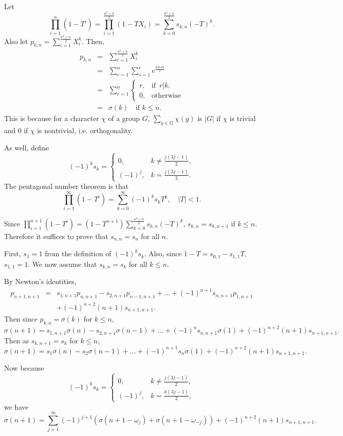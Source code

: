 \documentclass{amsart}
\begin{document}
Let
\[
\prod_{i=1}^n (1-T^i)=\prod_{i=1}^{\frac{n^2+n}{2}} (1-TX_i)=
\sum_{k=0}^{\frac{n^2+n}{2}} s_{k,n}(-T)^k.
\]
Also let $p_{k,n}=\sum_{i=1}^{\frac{n^2+n}{2}}X_i^k$.
Then,
\begin{eqnarray}
\nonumber
p_{k,n}&=&\sum_{i=1}^{\frac{n^2+n}{2}}X_i^k\\
\nonumber
&=&\sum_{r=1}^n \sum_{s=1}^r e^{\frac{2\pi isk}{r}}\\
\nonumber
&=&\sum_{r=1}^n \begin{cases}
r,&\textrm{if }\, r|k,\\
0,&\textrm{otherwise}
\label{pkn}
\end{cases}
\\
&=&\sigma(k) \quad \textrm{if $k\leq n$}.
\end{eqnarray}
This is because for a character $\chi$ of a group $G$, $\sum_{g \in G} \chi(g)$ is $|G|$ if $\chi$ is trivial and $0$ if $\chi$ is nontrivial, i.e. orthogonality.

As well, define
\[
(-1)^k s_k=\begin{cases}
0,&k \neq \frac{j(3j-1)}{2},\\
(-1)^j,& k=\frac{j(3j-1)}{2}.
\end{cases}
\]
The pentagonal number theorem is that
\[
\prod_{i=1}^\infty (1-T^i)=\sum_{k=0}^\infty (-1)^k s_k T^k, \quad |T|<1.
\]

Since $\prod_{i=1}^{n+1}(1-T^i)=(1-T^{n+1})\sum_{k=0}^{\frac{n^2+n}{2}}
s_{k,n}(-T)^k$, $s_{k,n}=s_{k,n+1}$ if $k \leq n$.
Therefore it suffices to prove that $s_{n,n}=s_n$ for all $n$.

First, $s_1=1$ from the definition of $(-1)^ks_k$. Also, since
$1-T=s_{0,1}-s_{1,1}T$, $s_{1,1}=1$. 
We now assume that $s_{k,n}=s_k$ for
all $k \leq n$.

By Newton's identities,
\begin{eqnarray*}
p_{n+1,n+1}&=&s_{1,n+1}p_{n,n+1}-s_{2,n+1}p_{n-1,n+1}+\ldots
+(-1)^{n+1}s_{n,n+1}p_{1,n+1}\\
&&+(-1)^{n+2}(n+1)s_{n+1,n+1}.
\end{eqnarray*}
Then since $p_{k,n}=\sigma(k)$ for $k \leq n$,
\[
\sigma(n+1)=s_{1,n+1}\sigma(n)-s_{2,n+1}\sigma(n-1)+\ldots+(-1)^ns_{n,n+1}\sigma(1)
+(-1)^{n+2}(n+1)s_{n+1,n+1}.
\]
Then as $s_{k,n+1}=s_k$ for $k \leq n$,
\[
\sigma(n+1)=s_1\sigma(n)-s_2\sigma(n-1)+\ldots+(-1)^{n+1}s_n\sigma(1)
+(-1)^{n+2}(n+1)s_{n+1,n+1}.
\]

Now because 
\[
(-1)^ks_k=\begin{cases}
0,&k \neq \frac{j(3j-1)}{2},\\
(-1)^j,&k=\frac{k(3j-1)}{2},
\end{cases}
\]
we have
\[
\sigma(n+1)=\sum_{j=1}^\infty (-1)^{j+1}(\sigma(n+1-\omega_j)
+\sigma(n+1-\omega_{-j}))
+(-1)^{n+2}(n+1)s_{n+1,n+1}.
\]
\end{document}
